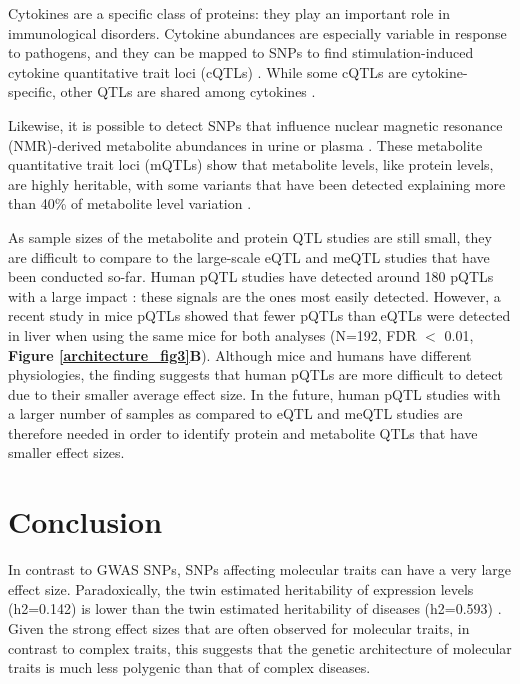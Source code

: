 Cytokines are a specific class of proteins: they play an important role in immunological disorders. Cytokine abundances are especially variable in response to pathogens, and they can be mapped to SNPs to find stimulation-induced cytokine quantitative trait loci (cQTLs) \cite{luMappingQuantitativeTrait2011,liInterindividualVariabilityGenetic2016}. While some cQTLs are cytokine-specific, other QTLs are shared among cytokines \cite{liInterindividualVariabilityGenetic2016}.

Likewise, it is possible to detect SNPs that influence nuclear magnetic resonance (NMR)-derived metabolite abundances in urine or plasma \cite{GenomeWideMetabolicQTL,shinAtlasGeneticInfluences2014}. These metabolite quantitative trait loci (mQTLs) show that metabolite levels, like protein levels, are highly heritable, with some variants that have been detected explaining more than 40\% of metabolite level variation \cite{GenomeWideMetabolicQTL}. 

As sample sizes of the metabolite and protein QTL studies are still small, they are difficult to compare to the large-scale eQTL and meQTL studies that have been conducted so-far. Human pQTL studies have detected around 180 pQTLs with a large impact \cite{wuVariationGeneticControl2013}: these signals are the ones most easily detected. However, a recent study in mice pQTLs \cite{chickDefiningConsequencesGenetic2016} showed that fewer pQTLs than eQTLs were detected in liver when using the same mice for both analyses (N=192, FDR $<$ 0.01, \textbf{Figure \ref{architecture_fig3}B}). Although mice and humans have different physiologies, the finding suggests that human pQTLs are more difficult to detect due to their smaller average effect size. In the future, human pQTL studies with a larger number of samples as compared to eQTL and meQTL studies are therefore needed in order to identify protein and metabolite QTLs that have smaller effect sizes.


\section{Conclusion}
In contrast to GWAS SNPs, SNPs affecting molecular traits can have a very large effect size. Paradoxically, the twin estimated heritability of expression levels (h2=0.142) \cite{wrightHeritabilityGenomicsGene2014} is lower than the twin estimated heritability of diseases (h2=0.593) \cite{poldermanMetaanalysisHeritabilityHuman2015}. Given the strong effect sizes that are often observed for molecular traits, in contrast to complex traits, this suggests that the genetic architecture of molecular traits is much less polygenic than that of complex diseases. 

